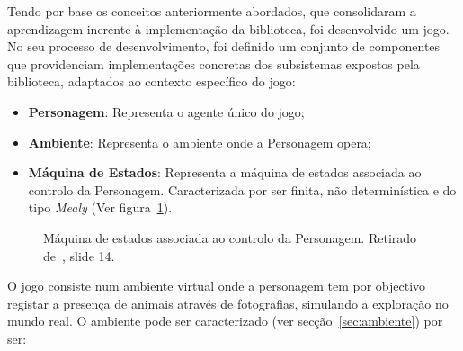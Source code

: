 Tendo por base os conceitos anteriormente abordados, que consolidaram a aprendizagem inerente à implementação da biblioteca, foi desenvolvido um jogo. No seu processo de desenvolvimento, foi definido um conjunto de componentes que providenciam implementações concretas dos subsistemas expostos pela biblioteca, adaptados ao contexto específico do jogo:

\begin{itemize}
    \item \textbf{Personagem}: Representa o agente único do jogo;
    \item \textbf{Ambiente}: Representa o ambiente onde a Personagem opera;
    \item \textbf{Máquina de Estados}: Representa a máquina de estados associada ao controlo da Personagem.
    Caracterizada por ser finita, não determinística e do tipo \textit{Mealy} (Ver figura~\ref{fig:projeto-parte1-maqest-personagem}).
\end{itemize}

\begin{figure}[H]
    \begin{center}
    \end{center}
    \caption{Máquina de estados associada ao controlo da Personagem.
    Retirado de~\cite{isel:iasa:slides:intro-eng-soft-parte-3}, slide 14.}\label{fig:projeto-parte1-maqest-personagem}
\end{figure}

O jogo consiste num ambiente virtual onde a personagem tem por objectivo registar a presença de animais através de fotografias, simulando a exploração no mundo real.
O ambiente pode ser caracterizado (ver secção~\ref{sec:ambiente}) por ser:


